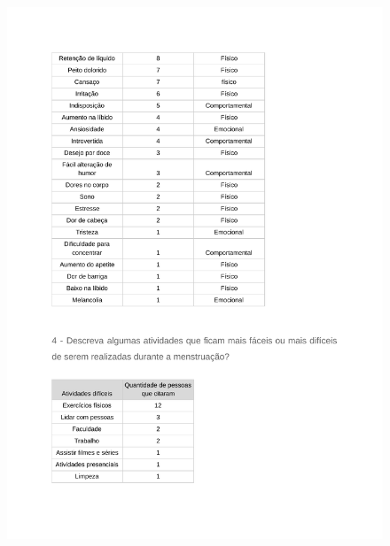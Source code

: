 \begin{apendicesenv}
    \begin{figure}[h]
        \centering
        \includegraphics[keepaspectratio=true,scale=0.7]{figuras/Tab17.pdf}
    \end{figure}
    

\end{apendicesenv}

